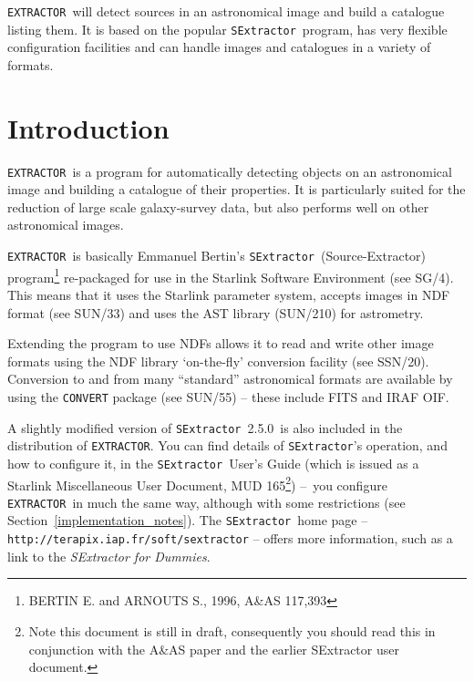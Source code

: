 \documentclass[twoside,11pt]{article}
\newcommand{\stardocinitials}  {SUN}
\newcommand{\stardocnumber}    {226.12}
\newcommand{\stardocabstract}  {\EXTRACTOR\ will detect sources in
an astronomical image and build a catalogue listing them. It is based on the
popular \SExtractor\ program, has very flexible configuration
facilities and can handle images and catalogues in a variety of formats.}
\newcommand{\sexversion}{2.5.0}
\newcommand{\stardocname}{\stardocinitials /\stardocnumber}
\newcommand{\htmladdnormallink}[2]{#1}
\newcommand{\htmlref}[2]{#1}
\newenvironment{latexonly}{}{}
\newcommand{\latex}[1]{#1}
\newcommand{\xref}[3]{#1}
\newcommand{\xlabel}[1]{}
\renewcommand{\_}{\texttt{\symbol{95}}}
\newcommand{\EXTRACTOR}{\texttt{EXTRACTOR}}
\newcommand{\CONVERT}{\texttt{CONVERT}}
\newcommand{\SExtractor}{\texttt{SExtractor}}
\newcommand{\SExtractorURL}{http://terapix.iap.fr/soft/sextractor}
\newcommand{\DUMMIESURL}{SE_Handbook.4.pdf}
\newcommand{\IRAFURL}{http://iraf.noao.edu}
\newcommand{\FITSURL}{http://fits.gsfc.nasa.gov/}
\newcommand{\MUD}{mud165.pdf}
\newcommand{\dash}{--}
\newcommand{\dash}{-}
\renewcommand{\thepage}{\roman{page}}
\begin{document}
\stardocabstract
  \newpage
  \begin{latexonly}
    \setlength{\parskip}{0mm}
    \tableofcontents
    \setlength{\parskip}{\medskipamount}
    \markboth{\stardocname}{\stardocname}
  \end{latexonly}
\cleardoublepage
\renewcommand{\thepage}{\arabic{page}}
\setcounter{page}{1}

\section{\xlabel{introduction}Introduction}
\EXTRACTOR\ is a program for automatically detecting objects on an
astronomical image and building a catalogue of their properties. It is
particularly suited for the reduction of large scale galaxy-survey
data, but also performs well on other astronomical images.

\EXTRACTOR\ is basically Emmanuel Bertin's \SExtractor\
(Source-Extractor) program\footnote{BERTIN E. and ARNOUTS S., 1996,
A\&AS 117,393} re-packaged for use in the
\xref{Starlink Software Environment}{sg4}{} \latex{(see SG/4)}.
This means that it uses the Starlink parameter system, accepts images in
\xref{NDF}{sun33}{abstract} format \latex{(see SUN/33)} and uses the
\xref{AST}{sun210}{} library \latex{(SUN/210)} for astrometry.

Extending the program to use NDFs allows it to read and write other
image formats using the NDF library \xref{`on-the-fly' conversion
facility}{ssn20}{abstract} \latex{(see SSN/20)}.  Conversion to and
from many ``standard'' astronomical
\xref{formats}{sun55}{the_default_conversion_commands} are available
by using the \xref{\CONVERT}{sun55}{abstract} package \latex{(see
SUN/55)} -- these include \htmladdnormallink{FITS}{\FITSURL} and
\htmladdnormallink{IRAF}{\IRAFURL} OIF.

A slightly modified version of \SExtractor\ \sexversion\ is also
included in the distribution of \EXTRACTOR.
You can find details of \SExtractor's operation, and how to configure
it, in the \htmladdnormallink{\SExtractor\ User's Guide}{\MUD} (which is
issued as a Starlink Miscellaneous User Document, MUD 165\footnote{Note this
document is still in draft, consequently you should read this in
conjunction with the \htmladdnormallink{A\&AS paper}{sexpaper.ps}
and the \htmladdnormallink{earlier SExtractor user document}{sex1_doc.ps}.})
\dash\ you configure \EXTRACTOR\
in much the same way, although with
\htmlref{some restrictions}{implementation_notes}
\latex{(see Section~\ref{implementation_notes})}. The \SExtractor\ home page
-- \htmladdnormallink{\texttt{\SExtractorURL}}{\SExtractorURL} --
offers more information, such as a link to the
\htmladdnormallink{\textit{SExtractor for Dummies}}{\DUMMIESURL}.
\end{document}
